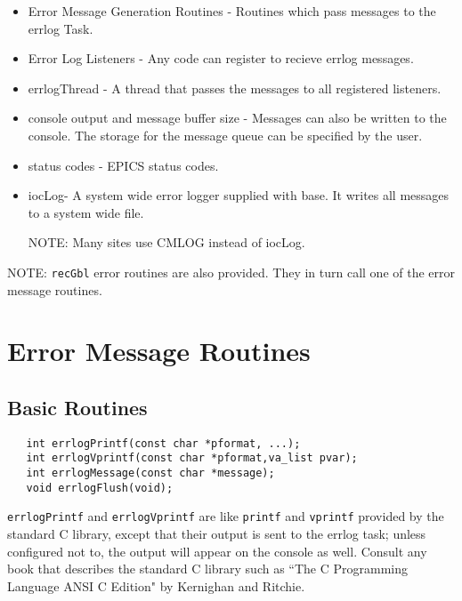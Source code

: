 \begin{itemize}
\item Error Message Generation Routines - Routines which pass messages to the errlog Task.

\item Error Log Listeners - Any code can register to recieve errlog messages.

\item errlogThread - A thread that passes the messages to all registered listeners.

\item console output and message buffer size - Messages can also be written to the console. The storage for the message 
queue can be specified by the user.

\item status codes - EPICS status codes.

\item iocLog- A system wide error logger supplied with base. It writes all messages to a system wide file.

NOTE: Many sites use CMLOG instead of iocLog.

\end{itemize}

NOTE: \verb|recGbl| error routines are also provided. They in turn call one of the error message routines.

\section{Error Message Routines}

\subsection{Basic Routines}

\begin{verbatim}
   int errlogPrintf(const char *pformat, ...);
   int errlogVprintf(const char *pformat,va_list pvar);
   int errlogMessage(const char *message);
   void errlogFlush(void);
\end{verbatim}
 \verb|errlogPrintf| and  \verb|errlogVprintf| are like \verb|printf| and \verb|vprintf| provided by the standard C library, except 
that their output is sent to the errlog task; unless configured not to, the output will appear on the console as well. Consult 
any book that describes the standard C library such as ``The C Programming Language ANSI C Edition" by Kernighan 
and Ritchie.

